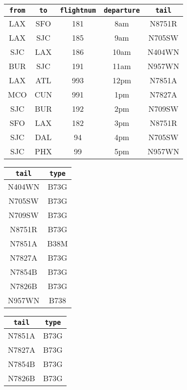 \documentclass{report}
\renewcommand{\tt}[1]{\texttt{{#1}}}
\begin{document}
\begin{table}[ht]
    \begin{tabular}{c|c|c|c|c}
        \hline
        \tt{from} & \tt{to} & \tt{flightnum} & \tt{departure} & \tt{tail} \\
        \hline
        LAX & SFO & 181 & 8am & N8751R \\
        LAX & SJC & 185 & 9am & N705SW \\
        SJC & LAX & 186 & 10am & N404WN \\
        BUR & SJC & 191 & 11am & N957WN \\
        LAX & ATL & 993 & 12pm & N7851A \\
        MCO & CUN & 991 & 1pm & N7827A \\
        SJC & BUR & 192 & 2pm & N709SW \\
        SFO & LAX & 182 & 3pm & N8751R \\
        SJC & DAL & 94 & 4pm & N705SW \\
        SJC & PHX & 99 & 5pm & N957WN 
    \end{tabular}
    \hfill
    \begin{tabular}{c|c}
        \hline
        \tt{tail} & \tt{type} \\
        \hline
        N404WN & B73G \\
        N705SW & B73G \\
        N709SW & B73G \\
        N8751R & B73G \\
        N7851A & B38M \\
        N7827A & B73G \\
        N7854B & B73G \\
        N7826B & B73G \\
        N957WN & B738 
    \end{tabular}
    \hfill
    \begin{tabular}{c|c}
        \hline
        \tt{tail} & \tt{type} \\
        \hline
        N7851A & B73G \\
        N7827A & B73G \\
        N7854B & B73G \\
        N7826B & B73G
    \end{tabular}
\end{table}
\end{document}

